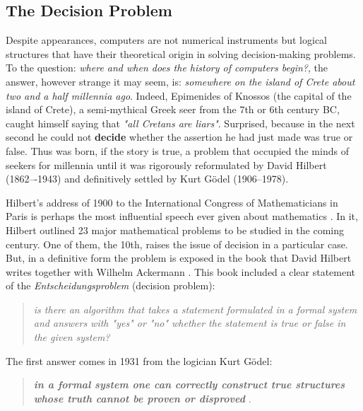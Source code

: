 \subsection{The Decision Problem}

Despite appearances, computers are not numerical instruments but logical structures that have their theoretical origin in solving decision-making problems. To the question: {\em where and when does the history of computers begin?}, the answer, however strange it may seem, is: {\em somewhere on the island of Crete about two and a half millennia ago}. Indeed, Epimenides of Knossos (the capital of the island of Crete), a semi-mythical Greek seer from the 7th or 6th century BC, caught himself saying that {\em "all Cretans are liars"}. Surprised, because in the next second he could not {\bf decide} whether the assertion he had just made was true or false. Thus was born, if the story is true, a problem that occupied the minds of seekers for millennia until it was rigorously reformulated by David Hilbert (1862–-1943) and definitively settled by Kurt G\" odel (1906--1978).

Hilbert's address of 1900 to the International Congress of Mathematicians in Paris is perhaps the most influential speech ever given about mathematics \cite{Hilbert1900}. In it, Hilbert outlined 23 major mathematical problems to be studied in the coming century. One of them, the 10th, raises the issue of decision in a particular case. But, in a definitive form the problem is exposed in the book that David Hilbert writes together with Wilhelm Ackermann \cite{Hilbert1928}. This book included a clear statement of the {\em Entscheidungsproblem} (decision problem): 
\begin{quote}
    {\em is there an algorithm that takes a statement formulated in a formal system and answers with "yes" or "no" whether the statement is true or false in the given system?}
\end{quote}
The first answer comes in 1931 from the logician  Kurt Gödel: 
\begin{quote}
{\bf {\em in a formal system one can correctly construct true structures whose truth cannot be proven or disproved}} \cite{Goedel1931} \cite{Goedel31}.
\end{quote}

